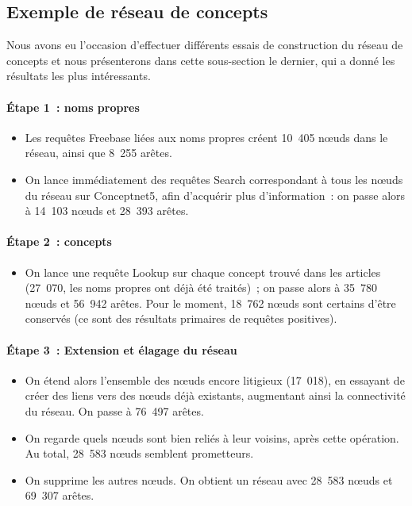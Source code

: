 \documentclass[a4paper, 12pt]{article}
\begin{document}
\subsection{Exemple de réseau de concepts}

Nous avons eu l'occasion d'effectuer différents essais de construction du réseau de concepts et nous présenterons dans cette sous-section le dernier, qui a donné les résultats les plus intéressants.

\paragraph{Étape 1~: noms propres}

\begin{itemize}
 \item Les requêtes Freebase liées aux noms propres créent 10~405 n\oe{}uds dans le réseau, ainsi que 8~255 arêtes.
 \item On lance immédiatement des requêtes Search correspondant à tous les n\oe{}uds du réseau sur Conceptnet5, afin d'acquérir plus d'information~: on passe alors à 14~103 n\oe{}uds et 28~393 arêtes.
\end{itemize}

\paragraph{Étape 2~: concepts}

\begin{itemize}
 \item On lance une requête Lookup sur chaque concept trouvé dans les articles (27~070, les noms propres ont déjà été traités)~; on passe alors à 35~780 n\oe{}uds et 56~942 arêtes. Pour le moment, 18~762 n\oe{}uds sont certains d'être conservés (ce sont des résultats primaires de requêtes positives).
\end{itemize}


\paragraph{Étape 3~: Extension et élagage du réseau}

\begin{itemize}
 \item On étend alors l'ensemble des n\oe{}uds encore litigieux (17~018), en essayant de créer des liens vers des n\oe{}uds déjà existants, augmentant ainsi la connectivité du réseau. On passe à 76~497 arêtes.
 \item On regarde quels n\oe{}uds sont bien reliés à leur voisins, après cette opération. Au total, 28~583 n\oe{}uds semblent prometteurs.
 \item On supprime les autres n\oe{}uds. On obtient un réseau avec 28~583 n\oe{}uds et 69~307 arêtes.
\end{itemize}
\end{document}
